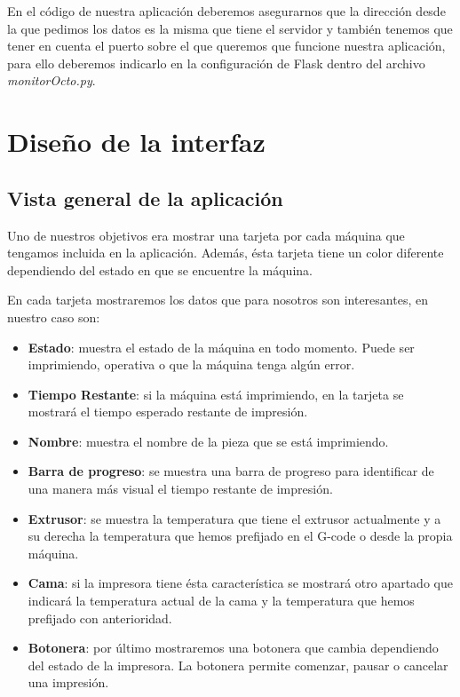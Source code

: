 En el código de nuestra aplicación deberemos asegurarnos que la dirección desde la que pedimos los datos es la misma que tiene el servidor y también tenemos que tener en cuenta el puerto sobre el que queremos que funcione nuestra aplicación, para ello deberemos indicarlo en la configuración de Flask dentro del archivo \textit{monitorOcto.py}.


\section{Diseño de la interfaz}
\subsection{Vista general de la aplicación}

Uno de nuestros objetivos era mostrar una tarjeta por cada máquina que tengamos incluida en la aplicación. Además, ésta tarjeta tiene un color diferente dependiendo del estado en que se encuentre la máquina. 

En cada tarjeta mostraremos los datos que para nosotros son interesantes, en nuestro caso son:
\begin{itemize}
\item \textbf{Estado}: muestra el estado de la máquina en todo momento. Puede ser imprimiendo, operativa o que la máquina tenga algún error.
\item \textbf{Tiempo Restante}: si la máquina está imprimiendo, en la tarjeta se mostrará el tiempo esperado restante de impresión.
\item \textbf{Nombre}: muestra el nombre de la pieza que se está imprimiendo.
\item \textbf{Barra de progreso}: se muestra una barra de progreso para identificar de una manera más visual el tiempo restante de impresión.
\item \textbf{Extrusor}: se muestra la temperatura que tiene el extrusor actualmente y a su derecha la temperatura que hemos prefijado en el G-code o desde la propia máquina.
\item \textbf{Cama}: si la impresora tiene ésta característica se mostrará otro apartado que indicará la temperatura actual de la cama y la temperatura que hemos prefijado con anterioridad.
\item \textbf{Botonera}: por último mostraremos una botonera que cambia dependiendo del estado de la impresora. La botonera permite comenzar, pausar o cancelar una impresión.
\end{itemize}

